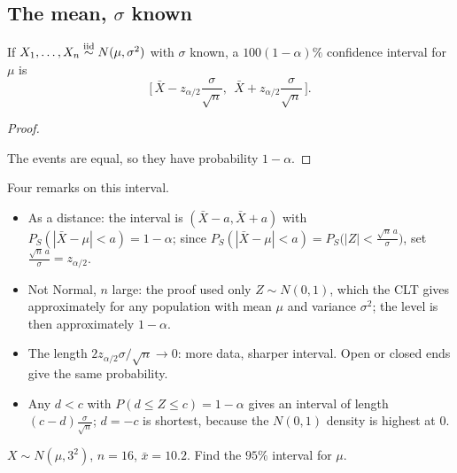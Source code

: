 \subsection*{The mean, $\sigma$ known}

\begin{theorem}
If $X_1,\dots,X_n\overset{\text{iid}}{\sim} N(\mu,\sigma^2)$ with $\sigma$ known, a $100(1-\alpha)\%$ confidence interval for $\mu$ is
\[
  \boxed{\;\Big[\,\bar X-z_{\alpha/2}\frac{\sigma}{\sqrt n},\ \ \bar X+z_{\alpha/2}\frac{\sigma}{\sqrt n}\,\Big].\;}
\]
\end{theorem}
\begin{proof}
\begin{deriv}
\end{deriv}
The events are equal, so they have probability $1-\alpha$.
\end{proof}

Four remarks on this interval.
\begin{itemize}
  \item As a distance: the interval is $(\bar X-a,\bar X+a)$ with $P_S(|\bar X-\mu|<a)=1-\alpha$; since $P_S(|\bar X-\mu|<a)=P_S\big(|Z|<\frac{\sqrt n\,a}{\sigma}\big)$, set $\frac{\sqrt n\,a}{\sigma}=z_{\alpha/2}$.
  \item Not Normal, $n$ large: the proof used only $Z\sim N(0,1)$, which the CLT gives approximately for any population with mean $\mu$ and variance $\sigma^2$; the level is then approximately $1-\alpha$.
  \item The length $2z_{\alpha/2}\sigma/\sqrt n\to0$: more data, sharper interval. Open or closed ends give the same probability.
  \item Any $d<c$ with $P(d\le Z\le c)=1-\alpha$ gives an interval of length $(c-d)\frac{\sigma}{\sqrt n}$; $d=-c$ is shortest, because the $N(0,1)$ density is highest at $0$.
\end{itemize}

\begin{example}
$X\sim N(\mu,3^2)$, $n=16$, $\bar x=10.2$. Find the $95\%$ interval for $\mu$.
\begin{deriv}
\end{deriv}
\end{example}

